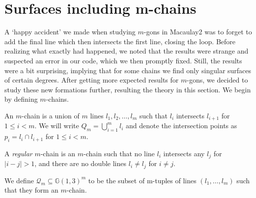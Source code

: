 \section{Surfaces including m-chains}\label{sec:m-chain}

A `happy accident' we made when studying $m$-gons in Macaulay2 was to forget to add the final line which then intersects the first line, closing the loop. Before realizing what exactly had happened, we noted that the results were strange and suspected an error in our code, which we then promptly fixed. Still, the results were a bit surprising, implying that for some chains we find only singular surfaces of certain degrees. After getting more expected results for $m$-gons, we decided to study these new formations further, resulting the theory in this section. We begin by defining $m$-chains.

\begin{definition}
    An $m$-chain is a union of $m$ lines $l_1, l_2, \dots, l_m$ such that $l_i$ intersects $l_{i+1}$ for $1 \leq i < m$. We will write $Q_m = \bigcup_{i=1}^m l_i$ and denote the intersection points as $p_i = l_i \cap l_{i+1}$ for $1 \leq i < m$. 
\end{definition}
\begin{definition}
    A \emph{regular} $m$-chain is an $m$-chain such that no line $l_i$ intersects any $l_j$ for $|i - j| > 1$, and there are no double lines $l_i \neq l_j$ for $i \neq j$.
\end{definition}

\begin{definition}
    We define $\mathcal{Q}_m \subseteq \mathbb{G}(1,3)^m$ to be the subset of m-tuples of lines $(l_1, \dots, l_m)$ such that they form an $m$-chain.
\end{definition}


